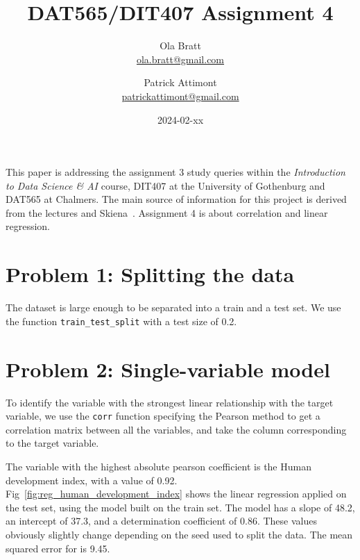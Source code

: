 \documentclass[a4paper]{article}
\begin{document}
\author{Ola Bratt \\
  \href{mailto:ola.bratt@gmail.com}{ola.bratt@gmail.com}
  \and
  Patrick Attimont \\
  \href{patrickattimont@gmail.com}{patrickattimont@gmail.com}
}

\title{DAT565/DIT407 Assignment 4}
\date{2024-02-xx}

\maketitle

This paper is addressing the assignment 3 study queries within the \emph{Introduction to Data Science \& AI} course, DIT407 at 
the University of Gothenburg and DAT565 at Chalmers. The main source of information for this project
is derived from the lectures and Skiena~\cite{Skiena:2024}. Assignment 4 is about correlation and linear regression.

\section*{Problem 1: Splitting the data}
The dataset is large enough to be separated into a train and a test set. We use the function \verb|train_test_split| with a test size of 0.2.


\section*{Problem 2: Single-variable model}
To identify the variable with the strongest linear relationship with the target variable, we use the \verb|corr| function specifying the Pearson method to get a correlation matrix between all the variables, and take the column corresponding to the target variable.

The variable with the highest absolute pearson coefficient is the Human development index, with a value of 0.92.
Fig~\ref{fig:reg_human_development_index} shows the linear regression applied on the test set, using the model built on the train set.
The model has a slope of 48.2, an intercept of 37.3, and a determination coefficient of 0.86. These values obviously slightly change depending on the seed used to split the data.
The mean squared error for is 9.45.
\end{document}
